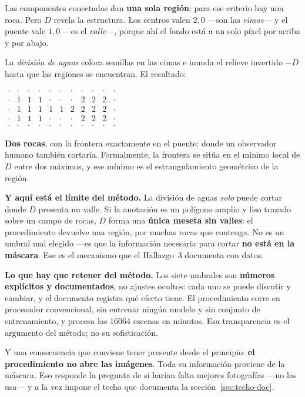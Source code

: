 \documentclass[11pt]{article}
\newcounter{preg}
\begin{document}
Las componentes conectadas dan \textbf{una sola región}: para ese criterio hay una roca.
Pero $D$ revela la estructura. Los centros valen $2{,}0$ —son las \emph{cimas}— y el
puente vale $1{,}0$ —es el \emph{valle}—, porque ahí el fondo está a un solo píxel por
arriba y por abajo.

La \emph{división de aguas} coloca semillas en las cimas e inunda el relieve invertido
$-D$ hasta que las regiones se encuentran. El resultado:

\begin{center}\small
$\begin{array}{ccccccccccc}
\cdot&\cdot&\cdot&\cdot&\cdot&\cdot&\cdot&\cdot&\cdot&\cdot&\cdot\\
\cdot&1&1&1&\cdot&\cdot&\cdot&2&2&2&\cdot\\
\cdot&1&1&1&1&1&2&2&2&2&\cdot\\
\cdot&1&1&1&\cdot&\cdot&\cdot&2&2&2&\cdot\\
\cdot&\cdot&\cdot&\cdot&\cdot&\cdot&\cdot&\cdot&\cdot&\cdot&\cdot
\end{array}$
\end{center}

\textbf{Dos rocas}, con la frontera exactamente en el puente: donde un observador humano
también cortaría. Formalmente, la frontera se sitúa en el mínimo local de $D$ entre dos
máximos, y ese mínimo es el estrangulamiento geométrico de la región.

\medskip
\textbf{Y aquí está el límite del método.} La división de aguas \emph{solo} puede cortar
donde $D$ presenta un valle. Si la anotación es un polígono amplio y liso trazado sobre un
campo de rocas, $D$ forma una \textbf{única meseta sin valles}: el procedimiento devuelve
una región, por muchas rocas que contenga. No es un umbral mal elegido —es que la
información necesaria para cortar \textbf{no está en la máscara}. Ese es el mecanismo que
el Hallazgo~3 documenta con datos.

\begin{caja}
\noindent\textbf{Lo que hay que retener del método.} Los siete umbrales son
\textbf{números explícitos y documentados}, no ajustes ocultos: cada uno se puede discutir
y cambiar, y el documento registra qué efecto tiene. El procedimiento corre en procesador
convencional, sin entrenar ningún modelo y sin conjunto de entrenamiento, y procesa las
\num{16064} escenas en minutos. Esa transparencia es el argumento del método; no su
sofisticación.

\smallskip
\noindent Y una consecuencia que conviene tener presente desde el principio:
\textbf{el procedimiento no abre las imágenes}. Toda su información proviene de la máscara.
Eso responde la pregunta de si harían falta mejores fotografías —no las usa— y a la vez
impone el techo que documenta la sección~\ref{sec:techo-doc}.
\end{caja}
\end{document}
